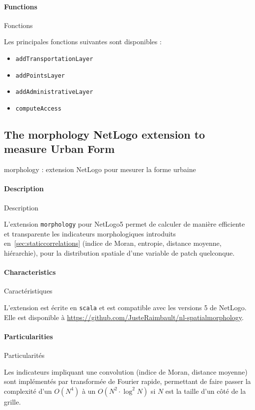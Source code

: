 \paragraph{Functions}{Fonctions}

Les principales fonctions suivantes sont disponibles :
\begin{itemize}
	\item \texttt{addTransportationLayer}
	\item \texttt{addPointsLayer}
	\item \texttt{addAdministrativeLayer}
	\item \texttt{computeAccess}
\end{itemize}



\subsection{The morphology NetLogo extension to measure Urban Form}{morphology : extension NetLogo pour mesurer la forme urbaine}

\label{app:subsec:morphologyextension}

\paragraph{Description}{Description}

L'extension \texttt{morphology} pour NetLogo5 permet de calculer de manière efficiente et transparente les indicateurs morphologiques introduits en~\ref{sec:staticcorrelations} (indice de Moran, entropie, distance moyenne, hiérarchie), pour la distribution spatiale d'une variable de patch quelconque.

\paragraph{Characteristics}{Caractéristiques}

L'extension est écrite en \texttt{scala} et est compatible avec les versions 5 de NetLogo. Elle est disponible à \url{https://github.com/JusteRaimbault/nl-spatialmorphology}.


\paragraph{Particularities}{Particularités}

Les indicateurs impliquant une convolution (indice de Moran, distance moyenne) sont implémentés par transformée de Fourier rapide, permettant de faire passer la complexité d'un $O(N^4)$ à un $O(N^2\cdot \log^2 N)$ si $N$ est la taille d'un côté de la grille. 


